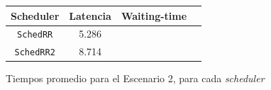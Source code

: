 \begin{figure}[H]
    \begin{center}
        \begin{tabular}{|c|c|c|c|}
            \hline
            \textbf{Scheduler} & \textbf{Latencia} & \textbf{Waiting-time} \\ \hline
            \texttt{SchedRR}   & 5.286 &  \\
            \texttt{SchedRR2}  & 8.714 &  \\ \hline
        \end{tabular}
        \caption{Tiempos promedio para el Escenario 2, para cada \emph{scheduler}}
    \end{center}
\end{figure}
